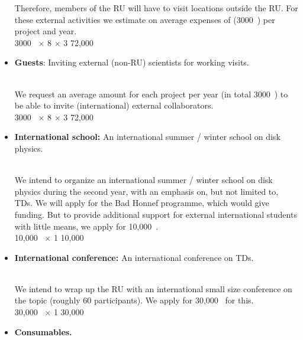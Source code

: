 \documentclass[10pt,fleqn,twoside]{article}
\begin{document}
\begin{itemize}
Therefore, members of the RU will have to visit locations outside the RU. 
For these external activities we estimate on average expenses of (3000~\EUR{})
per project and year.
\vspace{0.2em}\\
3000~\EUR{} $\times$ 8 $\times$ 3    \hfill 72,000~\EUR{}\\
\item 
\begin{Emphasize}
{\bf Guests}: Inviting external (non-RU) scientists for working visits.
\end{Emphasize}\\
We request an average amount for each project per year (in total 3000~\EUR{}) to
be able to invite (international) external collaborators.
\vspace{0.2em}\\
3000~\EUR{} $\times$ 8 $\times$ 3    \hfill 72,000~\EUR{}\\
\item 
\begin{Emphasize}
{\bf International school:} An international summer / winter school on disk physics.
\end{Emphasize}\\
We intend to organize an international summer / winter school on disk physics
during the second year,
with an emphasis on, but not limited to, TDs. We will apply for the Bad Honnef
programme, which would give funding. But to provide additional support for
external international students with little means, we apply for 10,000~\EUR{}. 
\vspace{0.2em}\\
10,000~\EUR{} $\times$ 1              \hfill 10,000~\EUR{}\\
\item 
\begin{Emphasize}
{\bf International conference:} An international conference on TDs.
\end{Emphasize}\\
We intend to wrap up the RU with an international small size conference
on the topic (roughly 60 participants). We apply for 30,000~\EUR{} for this.
\vspace{0.2em}\\
30,000~\EUR{} $\times$ 1              \hfill 30,000~\EUR{}\\
\item 
\begin{Emphasize}
{\bf Consumables.}
\end{Emphasize}\\

\end{itemize}
\end{document}
